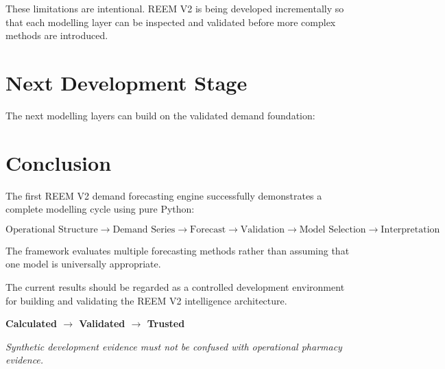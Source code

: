 \documentclass[11pt,a4paper]{article}
\begin{document}
These limitations are intentional. REEM V2 is being developed
incrementally so that each modelling layer can be inspected and validated
before more complex methods are introduced.

\section{Next Development Stage}

The next modelling layers can build on the validated demand foundation:

\begin{center}
\end{center}

\section{Conclusion}

The first REEM V2 demand forecasting engine successfully demonstrates a
complete modelling cycle using pure Python:

\[
\text{Operational Structure}
\rightarrow
\text{Demand Series}
\rightarrow
\text{Forecast}
\rightarrow
\text{Validation}
\rightarrow
\text{Model Selection}
\rightarrow
\text{Interpretation}
\]

The framework evaluates multiple forecasting methods rather than assuming
that one model is universally appropriate.

The current results should be regarded as a controlled development
environment for building and validating the REEM V2 intelligence
architecture.

\begin{center}
\vspace{0.5cm}

\textcolor{titleColor}{
\Large\textbf{
Calculated $\rightarrow$ Validated $\rightarrow$ Trusted
}}

\vspace{0.3cm}

\textit{
Synthetic development evidence must not be confused with operational
pharmacy evidence.
}

\end{center}
\end{document}
